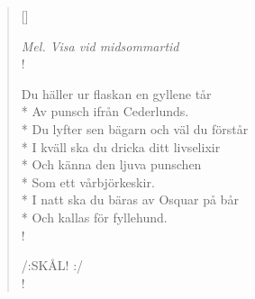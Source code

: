 \settowidth{\versewidth}{Av punsch ifrån Cederlunds. }


\begin{verse}[\versewidth]

\flagverse{}
\emph{Mel. Visa vid midsommartid}\\!

Du häller ur flaskan en gyllene tår\\*
Av punsch ifrån Cederlunds.\\*
Du lyfter sen bägarn och väl du förstår\\*
I kväll ska du dricka ditt livselixir\\*
Och känna den ljuva punschen\\*
Som ett vårbjörkeskir.\\*
I natt ska du bäras av Osquar på bår\\*
Och kallas för fyllehund.\\!


/:SKÅL! :/\\!




\end{verse}

